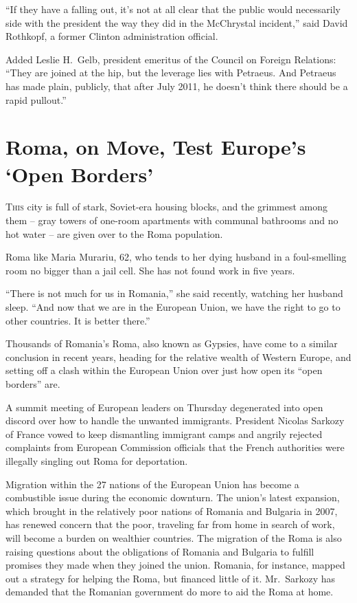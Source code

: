 ﻿\documentclass[12pt]{article}
\begin{document}
``If they have a falling out, it's not at all clear that the public would necessarily side with the
president the way they did in the McChrystal incident,'' said David Rothkopf, a former Clinton
administration official.

Added Leslie H.~Gelb, president emeritus of the Council on Foreign Relations: ``They are joined at
the hip, but the leverage lies with Petraeus. And Petraeus has made plain, publicly, that after July
2011, he doesn't think there should be a rapid pullout.''

\pagebreak
\section{Roma, on Move, Test Europe's `Open Borders'}

\lettrine{T}{his} city is full of stark, Soviet-era housing blocks, and the
grimmest among them -- gray towers of one-room apartments with communal bathrooms and no hot water
-- are given over to the Roma population.

Roma like Maria Murariu, 62, who tends to her dying husband in a foul-smelling room no bigger than a
jail cell. She has not found work in five years.

``There is not much for us in Romania,'' she said recently, watching her husband sleep. ``And now
that we are in the European Union, we have the right to go to other countries. It is better there.''

Thousands of Romania's Roma, also known as Gypsies, have come to a similar conclusion in recent
years, heading for the relative wealth of Western Europe, and setting off a clash within the
European Union over just how open its ``open borders'' are.

A summit meeting of European leaders on Thursday degenerated into open discord over how to handle
the unwanted immigrants. President Nicolas Sarkozy of France vowed to keep dismantling immigrant
camps and angrily rejected complaints from European Commission officials that the French authorities
were illegally singling out Roma for deportation.

Migration within the 27 nations of the European Union has become a combustible issue during the
economic downturn. The union's latest expansion, which brought in the relatively poor nations of
Romania and Bulgaria in 2007, has renewed concern that the poor, traveling far from home in search
of work, will become a burden on wealthier countries. The migration of the Roma is also raising
questions about the obligations of Romania and Bulgaria to fulfill promises they made when they
joined the union. Romania, for instance, mapped out a strategy for helping the Roma, but financed
little of it. Mr.~Sarkozy has demanded that the Romanian government do more to aid the Roma at home.
\end{document}
